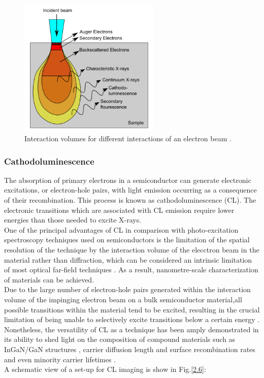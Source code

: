 \begin{figure}[h]
	\centering
	\includegraphics[width=0.6\textwidth]{Figs/Ch2/int.png}
	\caption {Interaction volumes for different interactions of an electron beam \cite{Puchtler2014}.}
	\label{2.5}
\end{figure}
\FloatBarrier



\subsubsection{Cathodoluminescence}

The absorption of primary electrons in a semiconductor can generate electronic excitations, or electron-hole pairs, with light emission occurring as a consequence of their recombination. This process is known as cathodoluminescence (CL). The electronic transitions which are associated with CL emission require lower energies than those needed to excite X-rays.\\
\indent One of the principal advantages of CL in comparison with photo-excitation spectroscopy techniques used on semiconductors is the limitation of the spatial resolution of the technique by the interaction volume of the elecctron beam in the material rather than diffraction, which can be considered an intrinsic limitation of most optical far-field techniques \cite{Edwards2011}. As a result, nanometre-scale characterization of materials can be achieved.\\
\indent Due to the large number of electron-hole pairs generated within the interaction volume of the impinging electron beam on a bulk semiconductor material,all possible transitions within the material tend to be excited, resulting in the crucial limitation of being unable to selectively excite transitions below a certain energy \cite{Edwards2011}. Nonetheless, the versatility of CL as a technique has been amply demonstrated in its ability to shed light on the composition of compound materials such as InGaN/GaN structures \cite{Martin2004}, carrier diffusion length and surface recombination rates \cite{Sercel1989} and even minority carrier lifetimes \cite{YacobiHolt1990}.\\
\indent A schematic view of a set-up for CL imaging is show in Fig.\ref{2.6}:

